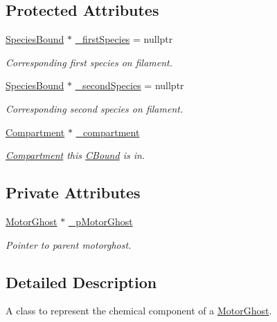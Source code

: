 \subsection*{Protected Attributes}
\begin{DoxyCompactItemize}
\item 
\hyperlink{classSpeciesBound}{Species\+Bound} $\ast$ \hyperlink{classCBound_a7ee4f44fd39c414be1f7b74b1031c1ce}{\+\_\+first\+Species} = nullptr
\begin{DoxyCompactList}\small\item\em Corresponding first species on filament. \end{DoxyCompactList}\item 
\hyperlink{classSpeciesBound}{Species\+Bound} $\ast$ \hyperlink{classCBound_ae6818ab861d273598a2507be75183e41}{\+\_\+second\+Species} = nullptr
\begin{DoxyCompactList}\small\item\em Corresponding second species on filament. \end{DoxyCompactList}\item 
\hyperlink{classCompartment}{Compartment} $\ast$ \hyperlink{classCBound_a95a66719b898cf32e60ae7137186bbbf}{\+\_\+compartment}
\begin{DoxyCompactList}\small\item\em \hyperlink{classCompartment}{Compartment} this \hyperlink{classCBound}{C\+Bound} is in. \end{DoxyCompactList}\end{DoxyCompactItemize}
\subsection*{Private Attributes}
\begin{DoxyCompactItemize}
\item 
\hyperlink{classMotorGhost}{Motor\+Ghost} $\ast$ \hyperlink{classCMotorGhost_a248b8fee5ba1d85c989f666e3a908261}{\+\_\+p\+Motor\+Ghost}
\begin{DoxyCompactList}\small\item\em Pointer to parent motorghost. \end{DoxyCompactList}\end{DoxyCompactItemize}


\subsection{Detailed Description}
A class to represent the chemical component of a \hyperlink{classMotorGhost}{Motor\+Ghost}. 

